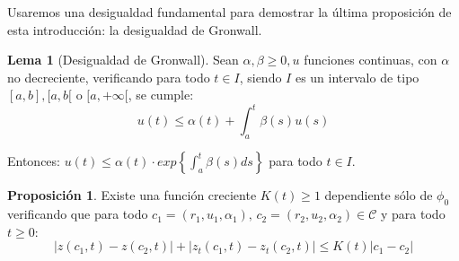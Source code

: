 \documentclass[a4paper,10pt]{scrartcl}
\theoremstyle{definition}
\newtheorem{lemma}{Lema}
\newtheorem{fact}{Proposición}
\numberwithin{equation}{section}
\begin{document}
Usaremos una desigualdad fundamental para demostrar la última proposición de esta introducción: la desigualdad de Gronwall.

\begin{lemma}[Desigualdad de Gronwall]
Sean $\alpha, \beta \ge 0, u$ funciones continuas, con $\alpha$ no decreciente, verificando para todo $t\in I$, siendo $I$ es un intervalo de tipo $[a,b], [a,b[$ o $[a,+\infty[$, se cumple:
\[
 u(t) \le \alpha(t) + \int_a^t \beta(s) u(s)
\]

Entonces: $u(t) \le \alpha(t) \cdot exp\left\{\int_a^t \beta(s) ds\right\}$ para todo $t\in I$.
\label{ineq:gronwall}
\end{lemma}

\begin{fact} \label{fact:ineq-curves}
 Existe una función creciente $K(t) \ge 1$ dependiente sólo de $\phi_0$ verificando que para todo $c_1=(r_1,u_1,\alpha_1), \, c_2=(r_2,u_2,\alpha_2) \in \mathcal{C}$ y para todo $t\ge 0$:
 \[|z(c_1,t) - z(c_2,t)| + |z_t(c_1,t) - z_t(c_2,t)| \le K(t)|c_1 - c_2|\]
\end{fact}
\end{document}
